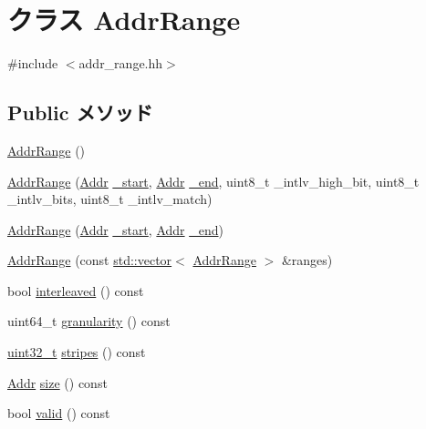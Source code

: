 \hypertarget{classAddrRange}{
\section{クラス AddrRange}
\label{classAddrRange}
}


{\ttfamily \#include $<$addr\_\-range.hh$>$}\subsection*{Public メソッド}
\begin{DoxyCompactItemize}
\item 
\hyperlink{classAddrRange_a44912ab62e2b99d5550e4580da4f0bb6}{AddrRange} ()
\item 
\hyperlink{classAddrRange_a76f19b26f65154f49d9316dbe37dbde6}{AddrRange} (\hyperlink{base_2types_8hh_af1bb03d6a4ee096394a6749f0a169232}{Addr} \hyperlink{classAddrRange_a8ae30d144fb49dec55c70ef1274df68a}{\_\-start}, \hyperlink{base_2types_8hh_af1bb03d6a4ee096394a6749f0a169232}{Addr} \hyperlink{classAddrRange_a945d5a5b811e52aaf2aa2ca0b1aff5c5}{\_\-end}, uint8\_\-t \_\-intlv\_\-high\_\-bit, uint8\_\-t \_\-intlv\_\-bits, uint8\_\-t \_\-intlv\_\-match)
\item 
\hyperlink{classAddrRange_ae9e275cc2d13224e46507e52869d9fa0}{AddrRange} (\hyperlink{base_2types_8hh_af1bb03d6a4ee096394a6749f0a169232}{Addr} \hyperlink{classAddrRange_a8ae30d144fb49dec55c70ef1274df68a}{\_\-start}, \hyperlink{base_2types_8hh_af1bb03d6a4ee096394a6749f0a169232}{Addr} \hyperlink{classAddrRange_a945d5a5b811e52aaf2aa2ca0b1aff5c5}{\_\-end})
\item 
\hyperlink{classAddrRange_a3f7bd25bb87bb07a17105ecfe3a41804}{AddrRange} (const \hyperlink{classstd_1_1vector}{std::vector}$<$ \hyperlink{classAddrRange}{AddrRange} $>$ \&ranges)
\item 
bool \hyperlink{classAddrRange_a5d52a3406dc6afea475c78ce06508afa}{interleaved} () const 
\item 
uint64\_\-t \hyperlink{classAddrRange_a2eca79b1c6faa6be9254f65e6e886355}{granularity} () const 
\item 
\hyperlink{Type_8hh_a435d1572bf3f880d55459d9805097f62}{uint32\_\-t} \hyperlink{classAddrRange_a922914e9ba305472e1643f0be3b6ab01}{stripes} () const 
\item 
\hyperlink{base_2types_8hh_af1bb03d6a4ee096394a6749f0a169232}{Addr} \hyperlink{classAddrRange_ade0faa4f478bf244b35fb208d640c648}{size} () const 
\item 
bool \hyperlink{classAddrRange_a8d985300b138b6c5556ab17ed4df3b38}{valid} () const 

\end{DoxyCompactItemize}
